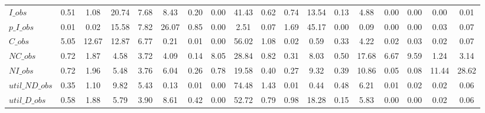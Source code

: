 \begin{center}
\begin{longtable}{lccccccccccccccccc}
$I\_obs         $	 & 	            0.51	 & 	            1.08	 & 	           20.74	 & 	            7.68	 & 	            8.43	 & 	            0.20	 & 	            0.00	 & 	           41.43	 & 	            0.62	 & 	            0.74	 & 	           13.54	 & 	            0.13	 & 	            4.88	 & 	            0.00	 & 	            0.00	 & 	            0.00	 & 	            0.01 \\ 
$p\_I\_obs      $	 & 	            0.01	 & 	            0.02	 & 	           15.58	 & 	            7.82	 & 	           26.07	 & 	            0.85	 & 	            0.00	 & 	            2.51	 & 	            0.07	 & 	            1.69	 & 	           45.17	 & 	            0.00	 & 	            0.09	 & 	            0.00	 & 	            0.00	 & 	            0.03	 & 	            0.07 \\ 
$C\_obs         $	 & 	            5.05	 & 	           12.67	 & 	           12.87	 & 	            6.77	 & 	            0.21	 & 	            0.01	 & 	            0.00	 & 	           56.02	 & 	            1.08	 & 	            0.02	 & 	            0.59	 & 	            0.33	 & 	            4.22	 & 	            0.02	 & 	            0.03	 & 	            0.02	 & 	            0.07 \\ 
$NC\_obs        $	 & 	            0.72	 & 	            1.87	 & 	            4.58	 & 	            3.72	 & 	            4.09	 & 	            0.14	 & 	            8.05	 & 	           28.84	 & 	            0.82	 & 	            0.31	 & 	            8.03	 & 	            0.50	 & 	           17.68	 & 	            6.67	 & 	            9.59	 & 	            1.24	 & 	            3.14 \\ 
$NI\_obs        $	 & 	            0.72	 & 	            1.96	 & 	            5.48	 & 	            3.76	 & 	            6.04	 & 	            0.26	 & 	            0.78	 & 	           19.58	 & 	            0.40	 & 	            0.27	 & 	            9.32	 & 	            0.39	 & 	           10.86	 & 	            0.05	 & 	            0.08	 & 	           11.44	 & 	           28.62 \\ 
$util\_ND\_obs  $	 & 	            0.35	 & 	            1.10	 & 	            9.82	 & 	            5.43	 & 	            0.13	 & 	            0.01	 & 	            0.00	 & 	           74.48	 & 	            1.43	 & 	            0.01	 & 	            0.44	 & 	            0.48	 & 	            6.21	 & 	            0.01	 & 	            0.02	 & 	            0.02	 & 	            0.06 \\ 
$util\_D\_obs   $	 & 	            0.58	 & 	            1.88	 & 	            5.79	 & 	            3.90	 & 	            8.61	 & 	            0.42	 & 	            0.00	 & 	           52.72	 & 	            0.79	 & 	            0.98	 & 	           18.28	 & 	            0.15	 & 	            5.83	 & 	            0.00	 & 	            0.00	 & 	            0.02	 & 	            0.06 \\ 

\end{longtable}
\end{center}
